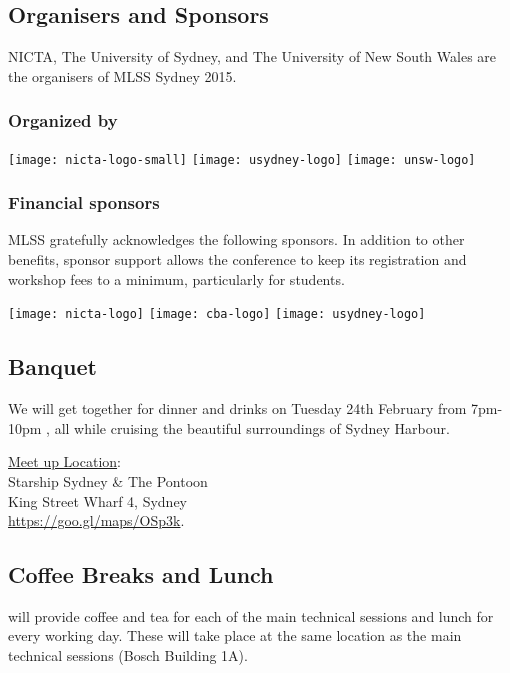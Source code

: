 \subsection*{Organisers and Sponsors}
NICTA, The University of Sydney, and The University of New South Wales are the 
organisers of MLSS Sydney 2015.
%
\subsubsection*{Organized by}
\begin{center}
\texttt{[image: nicta-logo-small]}
\texttt{[image: usydney-logo]}
\texttt{[image: unsw-logo]}
\end{center}
%
\subsubsection*{Financial sponsors}
MLSS gratefully acknowledges the following sponsors.  In
addition to other benefits, sponsor support allows the conference to
keep its registration and workshop fees to a minimum, particularly for
students.
%
 \vspace{-0.2in}
\begin{center}
  \begin{figure*}[h!]
\centering
     \texttt{[image: nicta-logo]}
     \texttt{[image: cba-logo]}     
 \texttt{[image: usydney-logo]}
    \end{figure*}
\end{center}
%
{}
\subsection*{Banquet}  
%
We will get together for dinner and drinks on Tuesday 24th February from 7pm-10pm , all while cruising  the beautiful 
surroundings of Sydney Harbour.

\underline{Meet up Location}:  \\
Starship Sydney \& The Pontoon \\ 
King Street Wharf 4, Sydney \\
 \url{https://goo.gl/maps/OSp3k}.
%
{}
\subsection*{Coffee Breaks and Lunch}
\mlss will provide coffee and tea for each of the main technical sessions 
 and lunch for every working day. These will take place at the same location as 
 the main technical sessions (Bosch Building 1A).
%
